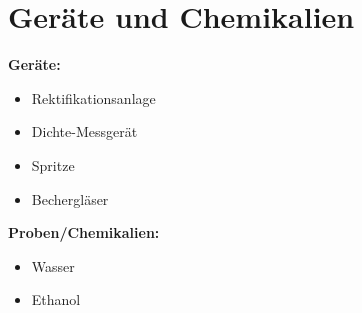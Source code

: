 \newpage
\section{Geräte und Chemikalien}
\label{sec:geraete}

\textbf{Geräte:}
\begin{itemize}
\item Rektifikationsanlage
\item Dichte-Messgerät
\item Spritze
\item Bechergläser
\end{itemize}

\vspace*{5mm}

\textbf{Proben/Chemikalien:}
\begin{itemize}
\item Wasser
\item Ethanol

\end{itemize}





